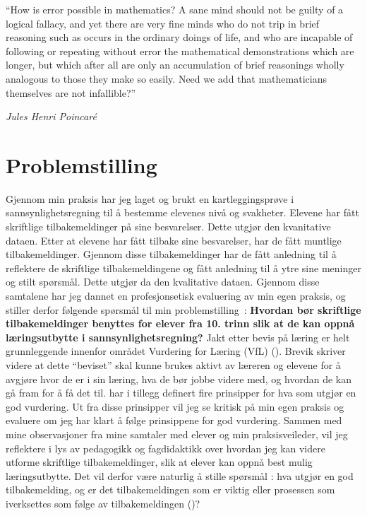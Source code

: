 \documentclass[main.tex]{subfiles}
\begin{document}
\setlength{\epigraphwidth}{0.8\textwidth}
\epigraph{``How is error possible in mathematics? 
A sane mind should not be guilty of a logical fallacy, 
and yet there are very fine minds who do not trip in brief reasoning 
such as occurs in the ordinary doings of life, 
and who are incapable of following or repeating without error 
the mathematical demonstrations which are longer, 
but which after all are only an accumulation of brief reasonings 
wholly analogous to those they make so easily. 
Need we add that mathematicians themselves are not infallible?''}
{\textit{Jules Henri Poincaré}}

\section*{Problemstilling}
Gjennom min praksis har jeg laget og brukt en kartleggingsprøve i sannsynlighetsregning til å bestemme
elevenes nivå og svakheter. Elevene har fått skriftlige tilbakemeldinger på sine besvarelser.
Dette utgjør den kvanitative dataen. Etter at elevene har fått tilbake sine besvarelser, har de fått
muntlige tilbakemeldinger. Gjennom disse tilbakemeldinger har de fått anledning til å reflektere
de skriftlige tilbakemeldingene og fått anledning til å ytre sine meninger og stilt spørsmål. Dette utgjør
da den kvalitative dataen. Gjennom disse samtalene har jeg dannet en profesjonsetisk
evaluering av min egen praksis, og stiller derfor følgende spørsmål til min \mbox{problemstilling :}
\newline
\newline
\textbf{Hvordan bør skriftlige tilbakemeldinger benyttes for elever fra 10.
trinn slik at de kan oppnå læringsutbytte i sannsynlighetsregning?}
\newline
\newline
Jakt etter bevis på læring er helt grunnleggende innenfor området Vurdering for Læring (VfL)
(). Brevik skriver videre at dette “beviset” skal kunne brukes aktivt
av læreren og elevene for å avgjøre hvor de er i sin læring, hva de bør jobbe videre med, og
hvordan de kan gå fram for å få det til.  har i tillegg definert fire
prinsipper for hva som utgjør en god vurdering. Ut fra disse prinsipper vil jeg se kritisk på min
egen praksis og evaluere om jeg har klart å følge prinsippene for god vurdering. Sammen med
mine observasjoner fra mine samtaler med elever og min praksisveileder, vil jeg reflektere i lys
av pedagogikk og fagdidaktikk over hvordan jeg kan videre utforme skriftlige tilbakemeldinger,
slik at elever kan oppnå best mulig læringsutbytte. Det vil derfor være naturlig å stille spørsmål :
hva utgjør en god tilbakemelding, og er det tilbakemeldingen som er viktig eller prosessen som
iverksettes som følge av tilbakemeldingen ()?  
\end{document}
